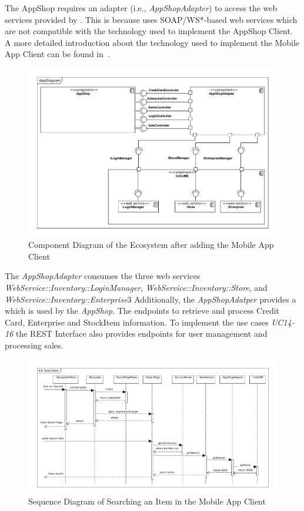 The AppShop requires an adapter (i.e., \textit{AppShopAdapter}) to access the web services provided by \CoCoME. %
This is because \CoCoME uses SOAP/WS*-based web services which are not compatible with the technology used to implement the AppShop Client. 
A more detailed introduction about the technology used to implement the Mobile App Client can be found in~\cite{schnabel}. 
  
 \begin{figure}[!h]
	\includegraphics[width=\textwidth]{img/appComponent.pdf}
	\caption{Component Diagram of the \CoCoME Ecosystem after adding the Mobile App Client}
	\label{ComponentApp}
\end{figure}

The \textit{AppShopAdapter} consumes the three web services \textit{WebService::Inventory::LoginManager}, \textit{WebService::Inventory::Store}, and \textit{WebService::Inventory::Enterprise}3
Additionally, the \textit{AppShopAdatper} provides a   which is used by the \textit{AppShop}. 
The   endpoints to retrieve and process Credit Card, Enterprise and StockItem information. 
To implement the use cases \emph{UC14-16} the REST Interface also provides endpoints for user management and processing sales. 
  
\begin{figure}[!h]
	\includegraphics[width=\textwidth]{img/appSearchSequence.pdf}
	\caption{Sequence Diagram of Searching an Item in the Mobile App Client}
	\label{SequenceAppSearch}
\end{figure}

